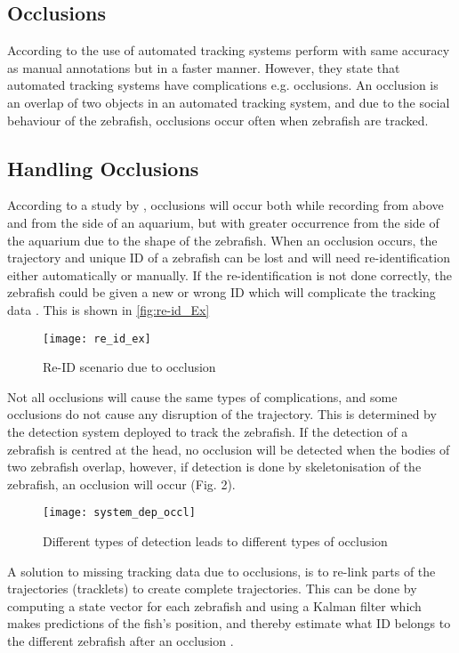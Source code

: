 \subsection{Occlusions}
According to  \cite{Green2012} the use of automated tracking systems perform with same accuracy as manual annotations but in a faster manner. However, they state that automated tracking systems have complications e.g. occlusions. An occlusion is an overlap of two objects in an automated tracking system, and due to the social behaviour of the zebrafish, occlusions occur often when zebrafish are tracked.

\subsection{Handling Occlusions}
According to a study by \cite{Qian2017}, occlusions will occur both while recording from above and from the side of an aquarium, but with greater occurrence from the side of the aquarium due to the shape of the zebrafish. When an occlusion occurs, the trajectory and unique ID of a zebrafish can be lost and will need re-identification either automatically or manually. If the re-identification is not done correctly, the zebrafish could be given a new or wrong ID which will complicate the tracking data \citep{Feijo2018}. This is shown in \autoref{fig:re-id_Ex}

\begin{figure}[H]
	\centering
	\texttt{[image: re\_id\_ex]}
	\caption{Re-ID scenario due to occlusion}
	\label{fig:re-id_Ex}
\end{figure}

Not all occlusions will cause the same types of complications, and some occlusions do not cause any disruption of the trajectory. This is determined by the detection system deployed to track the zebrafish. If the detection of a zebrafish is centred at the head, no occlusion will be detected when the bodies of two zebrafish overlap, however, if detection is done by skeletonisation of the zebrafish, an occlusion will occur (Fig. 2).\\

\begin{figure}[H]
	\centering
	\texttt{[image: system\_dep\_occl]}
	\caption{Different types of detection leads to different types of occlusion}
	\label{fig:system_dep_occl}
\end{figure}

A solution to missing tracking data due to occlusions, is to re-link parts of the trajectories (tracklets) to create complete trajectories. This can be done by computing a state vector for each zebrafish and using a Kalman filter which makes predictions of the fish’s position, and thereby estimate what ID belongs to the different zebrafish after an occlusion \citep{Feijo2018, Qian2014}.



